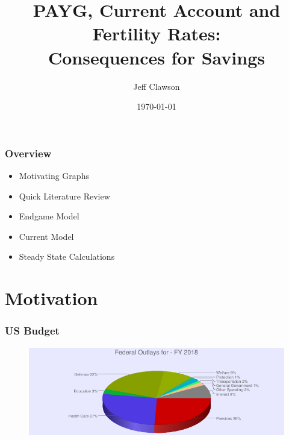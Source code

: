 \documentclass[11pt]{beamer}
\title[Econ 741 Project]{PAYG, Current Account and Fertility Rates: \\ Consequences for Savings}
\author[Clawson]{Jeff Clawson}
\date{\today}
\theoremstyle{definition}
\begin{document}
\begin{frame}
\titlepage %
\end{frame}

\begin{frame}
\frametitle{Overview} %
\begin{itemize}
    \item Motivating Graphs

    \item Quick Literature Review

    \item Endgame Model

    \item Current Model

    \item Steady State Calculations

\end{itemize}
\end{frame}



\section{Motivation} 
\begin{frame}
    \frametitle{US Budget}
\begin{figure}
	\centering
\includegraphics[scale=0.5]{chart.png}
	\label{V1}
\end{figure}

\end{frame}
\end{document}
